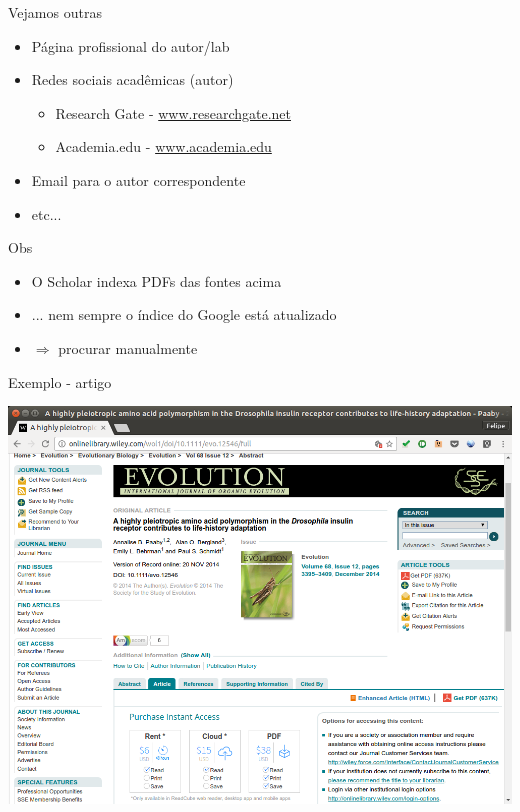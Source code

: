 \documentclass{beamer}
\begin{document}
\begin{frame}{Vejamos outras}
  \begin{itemize}
  \item Página profissional do autor/lab
  \item Redes sociais acadêmicas (autor)
    \begin{itemize}
    \item Research Gate - \url{www.researchgate.net}
    \item Academia.edu - \url{www.academia.edu}
    \end{itemize}
  \item Email para o autor correspondente
  \item etc...
  \end{itemize}
  \begin{block}{Obs}
    \begin{itemize}
    \item O Scholar indexa PDFs das fontes acima
    \item ... nem sempre o índice do Google está atualizado
    \item $\Rightarrow$ procurar manualmente
    \end{itemize}
  \end{block}
\end{frame}

\begin{frame}{Exemplo - artigo}
  \begin{center}
    \includegraphics[height=.9\textheight]{Busca/petrov1}
  \end{center}
\end{frame}
\end{document}
